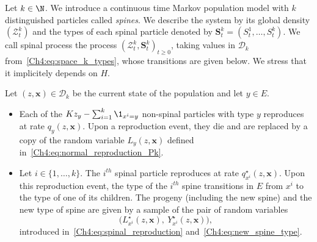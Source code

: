 \begin{refsegment}
\begin{defn}\label{def:spine_one_particle_per_family}
Let $k\in\N$.
We introduce a continuous time Markov population model with $k$ distinguished particles called \emph{spines}. We describe the system by its global density $(\mathcal{Z}^k_t)$ and the types of each spinal particle denoted by $\bm{S}_t^k = (S_t^1, \ldots, S_t^k)$.  We call spinal process the process $(\mathcal{Z}^k_t, \bm S^k_t)_{t\geq 0}$, taking values in $\mathscr{D}_k$ from~\eqref{Ch4:eq:space_k_types}, whose transitions are given below. We stress that it implicitely depends on $H$.
 
 Let $(z,\bm x) \in \mathscr{D}_{k}$ be the current state of the population and let $y\in E$. 
\begin{itemize}
    \item Each of the $Kz_y-\sum_{i=1}^k \1_{x^i=y}$  non-spinal particles with type $y$ reproduces at rate $q_{y}(z,\bm x)$. Upon a reproduction event, they die and are replaced by a copy of the random variable $L_y(z,\bm x)$ defined in~\eqref{Ch4:eq:normal_reproduction_Pk}.
    \item Let $i\in\{1,\ldots, k\}$. The $i^{th}$ spinal particle reproduces at rate $q^\star_{x^i}(z,\bm x)$. Upon this reproduction event, the type of the $i^{th}$ spine transitions in $E$ from $x^i$ to the type of  one of its children. The progeny (including the new spine) and the new type of spine are given by a sample of the pair of random variables 
    \[
    \big(L^\star_{x^i}(z,\bm x),\ Y^\star_{x^i}(z,\bm x)\big),
    \]
     introduced in~\eqref{Ch4:eq:spinal_reproduction} and~\eqref{Ch4:eq:new_spine_type}.
\end{itemize}
\end{defn}


\end{refsegment}
